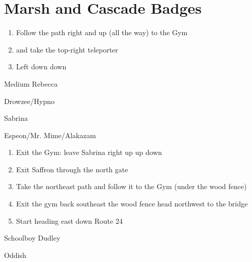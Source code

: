 \chapter{Marsh and Cascade Badges}
\vspace{0.5mm}

\begin{paracol}{2}
\begin{enumerate}
	\item Follow the path right and up (all the way) to the Gym
	\item {} and take the top-right teleporter
	\item Left \pointRight{} down  \pointRight{} down 
\end{enumerate}

\switchcolumn
\vspace{0.8cm}
\begin{trainer}{Medium Rebecca}
	\varwb
	\begin{fightSection}{Drowzee/Hypno}
		\item {} \return{} 
	\end{fightSection}
	\varwe
\end{trainer}

\switchcolumn
\begin{boss}{Sabrina}
	\varwb
	\begin{fightSection}{Espeon/Mr. Mime/Alakazam}
		\item {} \return{} 
	\end{fightSection}
	\varwe
\end{boss}

\begin{enumerate}[resume]
	\item Exit the Gym: leave Sabrina \pointRight{} right \pointRight{} up \pointRight{} up \pointRight{} down
	\item Exit Saffron through the north gate
	\item Take the northeast path and follow it to the Gym (under the wood fence)
	\item Exit the gym \pointRight{} back southeast the wood fence \pointRight{} head northwest to the bridge
	\item Start heading east down Route 24
\end{enumerate}

\begin{trainer}{Schoolboy Dudley}
	\varwb
	\begin{fightSection}{Oddish}
		\item {} \strength
	\end{fightSection}
	\varwe
\end{trainer}


\end{paracol}
